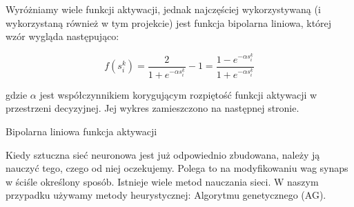 \documentclass[12pt,a4paper]{article}
\begin{document}
Wyróżniamy wiele funkcji aktywacji, jednak najczęściej wykorzystywaną (i wykorzystaną również w tym projekcie) jest funkcja bipolarna liniowa, której wzór wygląda następująco:

\begin{equation*}
    f(s^k_i) = \frac{2}{1 + e^{-\alpha s^k_i}} - 1 = \frac{1 - e^{-\alpha s^k_i}}{1 + e^{-\alpha s^k_i}}
\end{equation*}

\noindent gdzie $\alpha$ jest współczynnikiem korygującym rozpiętość funkcji aktywacji w przestrzeni decyzyjnej. Jej wykres zamieszczono na następnej stronie.

\begin{center}
    \newline Bipolarna liniowa funkcja aktywacji
\end{center}


Kiedy sztuczna sieć neuronowa jest już odpowiednio zbudowana, należy ją
nauczyć tego, czego od niej oczekujemy.
Polega to na modyfikowaniu wag synaps w ściśle określony sposób.
Istnieje wiele metod nauczania sieci. W naszym przypadku używamy metody heurystycznej: Algorytmu genetycznego (AG).
\end{document}

